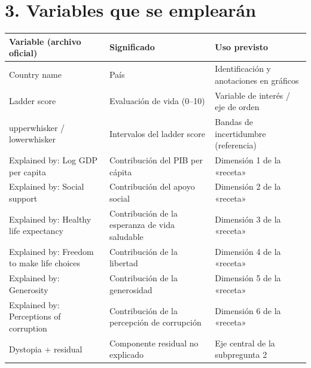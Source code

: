 \documentclass[
]{article}
\newcounter{none} %
\begin{document}
\section{3. Variables que se
emplearán}\label{variables-que-se-emplearuxe1n}

{\def\LTcaptype{none} %
\begin{longtable}[]{@{}
  >{\raggedright\arraybackslash}p{}
  >{\raggedright\arraybackslash}p{}
  >{\raggedright\arraybackslash}p{}@{}}
\toprule\noalign{}
\begin{minipage}[b]{\linewidth}\raggedright
\textbf{Variable (archivo oficial)}
\end{minipage} & \begin{minipage}[b]{\linewidth}\raggedright
\textbf{Significado}
\end{minipage} & \begin{minipage}[b]{\linewidth}\raggedright
\textbf{Uso previsto}
\end{minipage} \\
\midrule\noalign{}
\endhead
\bottomrule\noalign{}
\endlastfoot
Country name & País & Identificación y anotaciones en gráficos \\
Ladder score & Evaluación de vida (0--10) & Variable de interés / eje de
orden \\
upperwhisker / lowerwhisker & Intervalos del ladder score & Bandas de
incertidumbre (referencia) \\
Explained by: Log GDP per capita & Contribución del PIB per cápita &
Dimensión 1 de la «receta» \\
Explained by: Social support & Contribución del apoyo social & Dimensión
2 de la «receta» \\
Explained by: Healthy life expectancy & Contribución de la esperanza de
vida saludable & Dimensión 3 de la «receta» \\
Explained by: Freedom to make life choices & Contribución de la libertad
& Dimensión 4 de la «receta» \\
Explained by: Generosity & Contribución de la generosidad & Dimensión 5
de la «receta» \\
Explained by: Perceptions of corruption & Contribución de la percepción
de corrupción & Dimensión 6 de la «receta» \\
Dystopia + residual & Componente residual no explicado & Eje central de
la subpregunta 2 \\
\end{longtable}
}
\end{document}
